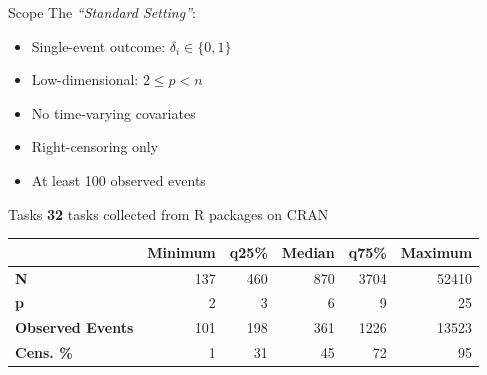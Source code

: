 \documentclass[aspectratio=169,12pt]{beamer}
\providecommand{\tightlist}{%
  \setlength{\itemsep}{2pt}\setlength{\parskip}{0pt}}
\begin{document}
\begin{frame}{Scope}
\label{scope}
The \emph{``Standard Setting''}:

\vspace{1em}

\begin{itemize}
\tightlist
\item
  Single-event outcome: \(\delta_i \in \{0, 1\}\)
\item
  Low-dimensional: \(2 \leq p < n\)
\item
  No time-varying covariates
\item
  Right-censoring only
\item
  At least 100 observed events
\end{itemize}
\end{frame}

\begin{frame}{Tasks}
\label{tasks}
\textbf{32} tasks collected from R packages on CRAN

\begin{table}
\centering
\begin{tabular}[t]{>{}lrrrrr}
\toprule
 & Minimum & q25\% & Median & q75\% & Maximum\\
\midrule
\textbf{N} & 137 & 460 & 870 & 3704 & 52410\\
\textbf{p} & 2 & 3 & 6 & 9 & 25\\
\textbf{Observed Events} & 101 & 198 & 361 & 1226 & 13523\\
\textbf{Cens. \%} & 1 & 31 & 45 & 72 & 95\\
\bottomrule
\end{tabular}
\end{table}
\end{frame}

\end{document}
